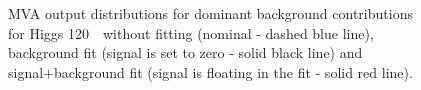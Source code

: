 \begin{figure}[!hbtp]
\caption{
MVA output distributions for dominant background contributions for
Higgs 120~\GeV\ without fitting (nominal - dashed blue line),
background fit (signal is set to zero - solid black line) and
signal+background fit (signal is floating in the fit - solid red
line).}
\label{fig:bdt2_120}
\end{figure}

